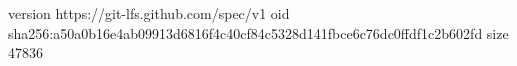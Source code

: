 version https://git-lfs.github.com/spec/v1
oid sha256:a50a0b16e4ab09913d6816f4c40cf84c5328d141fbce6c76dc0ffdf1c2b602fd
size 47836
